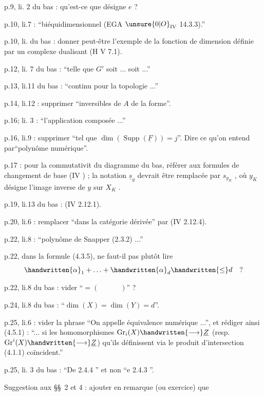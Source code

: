 
p.9, li. 2 du bas : qu'est-ce que désigne $e$ ?

p.10, li.7 : ``biéquidimensionnel (EGA $\unsure{0|O}_{\mathrm{IV}}$ 14.3.3).''

p.10, li. du bas : donner peut-être l'exemple de la fonction de dimension définie par un complexe dualisant (\handwritten{[}H\handwritten{]} V 7.1).

p.12, li. 7 du bas : ``telle que $G'$ soit ... soit ...''

p.13, li.11 du bas : ``continu pour la topologie ...''

p.14, li.12 : supprimer ``inversibles de $A$ de la forme''.

p.16; li. 3 : ``l'application composée ...''

p.16, li.9 : supprimer ``tel que $\dim(\operatorname{Supp}(\underline{F}))=j$''. Dire ce qu'on entend par``polynôme numérique''.

p.17 : pour la commutativit du diagramme du bas, référer aux formules de changement de base (IV \hspace{3em}) ; la notation $\underline{s}_y$ devrait être remplacée par $s_{y_K}$ , où $y_K$ désigne l'image inverse de $y$ sur $X_K$ .

p.19, li.13 du bas : (IV 2.12.1).

p.20, li.6 : remplacer ``dans la catégorie dérivée'' par (IV 2.12.4).

p.22, li.8 : ``polynôme de Snapper (2.3.2) ...''

p.22, dans la formule (4.3.5), ne faut-il pas plutôt lire
\[
\handwritten{\alpha}_1+\ldots+\handwritten{\alpha}_d\handwritten{\leq}d\quad ?
\]


p.22, li.8 du bas : vider ``$=(\hspace{3em})$'' ?

p.24, li.8 du bas : ``$\dim(X)=\dim(Y)=d$''.

p.25, li.6 : vider la phrase ``On appelle équivalence numérique ...'', et rédiger ainsi (4.5.1) : ``... si les homomorphismes $\operatorname{Gr}_i(X)\handwritten{\longrightarrow}\underline{Z}$ (resp. $\operatorname{Gr}^i(X)\handwritten{\longrightarrow}\underline{Z}$) qu'ils définissent via le produit d'intersection (4.1.1) coïncident.''

p.25, li. 3 du bas : ``De 2.4.4 '' et non ``e 2.4.3 ''.

Suggestion aux \S\S\ 2 et 4 : ajouter en remarque (ou exercice) que
